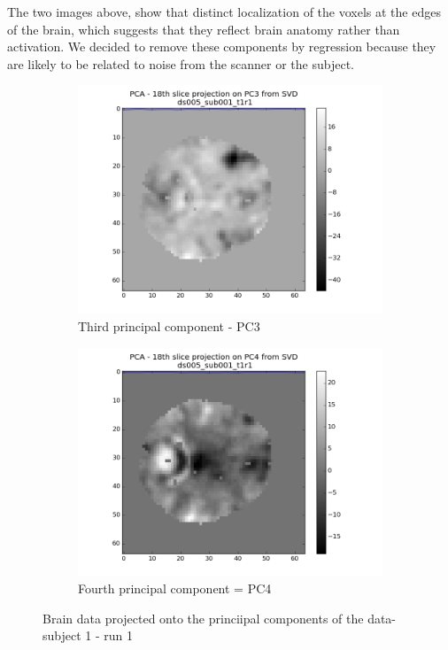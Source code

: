 \noindent
The two images above, show that distinct localization of the voxels at the edges of the
brain, which suggests that they reflect brain anatomy rather than activation. 
We decided to remove these components by regression because they are likely to be 
related to noise from the scanner or the subject. 

\begin{figure}[H]
\begin{subfigure}{.5\textwidth}
    \centering
    \includegraphics[width=.9\linewidth]{../fig/pca/ds005_sub001_t1r1_PC3.png}
    \caption{Third principal component - PC3}
    \label{fig:pca3}
\end{subfigure}%
\begin{subfigure}{.5\textwidth}
    \centering
    \includegraphics[width=.9\linewidth]{../fig/pca/ds005_sub001_t1r1_PC4.png}
    \caption{Fourth principal component = PC4}
    \label{fig:pca4}
\end{subfigure}
\caption{Brain data projected onto the princiipal components of the data- subject 1 - run 1}
\label{fig:pcab}
\end{figure}

